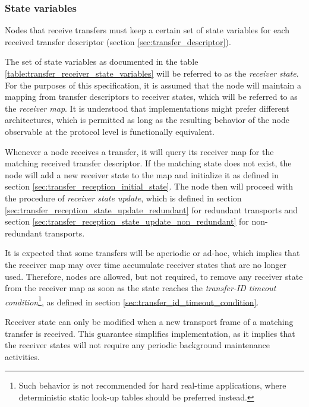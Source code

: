 \subsubsection{State variables}

Nodes that receive transfers must keep a certain set of state variables for each
received transfer descriptor (section \ref{sec:transfer_descriptor}).

The set of state variables as documented in the table \ref{table:transfer_receiver_state_variables}
will be referred to as the \emph{receiver state}.
For the purposes of this specification, it is assumed that the node will maintain a
mapping from transfer descriptors to receiver states, which will be referred to as the \emph{receiver map}.
It is understood that implementations might prefer different architectures, which is permitted as
long as the resulting behavior of the node observable at the protocol level is functionally equivalent.

Whenever a node receives a transfer, it will query its receiver map for the matching received transfer descriptor.
If the matching state does not exist, the node will add a new receiver state to the map
and initialize it as defined in section \ref{sec:transfer_reception_initial_state}.
The node then will proceed with the procedure of \emph{receiver state update},
which is defined in section \ref{sec:transfer_reception_state_update_redundant} for redundant transports
and section \ref{sec:transfer_reception_state_update_non_redundant} for non-redundant transports.

It is expected that some transfers will be aperiodic or ad-hoc,
which implies that the receiver map may over time accumulate receiver states that are no longer used.
Therefore, nodes are allowed, but not required, to remove any receiver state from the receiver map
as soon as the state reaches the \emph{transfer-ID timeout condition}\footnote{Such behavior is
not recommended for hard real-time applications, where deterministic static look-up tables
should be preferred instead.},
as defined in section \ref{sec:transfer_id_timeout_condition}.

Receiver state can only be modified when a new transport frame of a matching transfer is received.
This guarantee simplifies implementation, as it implies that the receiver states will not
require any periodic background maintenance activities.

